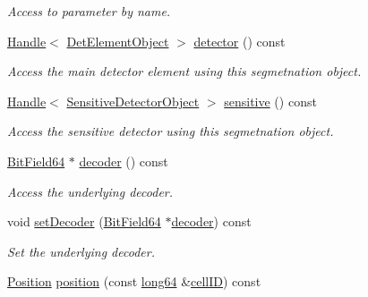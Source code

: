 \begin{DoxyCompactItemize}
\begin{DoxyCompactList}\small\item\em Access to parameter by name. \end{DoxyCompactList}\item 
\hyperlink{class_d_d4hep_1_1_handle}{Handle}$<$ \hyperlink{class_d_d4hep_1_1_geometry_1_1_det_element_object}{Det\+Element\+Object} $>$ \hyperlink{class_d_d4hep_1_1_geometry_1_1_segmentation_a7960b9b5d6233ee3e3e42893f3ea1d66}{detector} () const
\begin{DoxyCompactList}\small\item\em Access the main detector element using this segmetnation object. \end{DoxyCompactList}\item 
\hyperlink{class_d_d4hep_1_1_handle}{Handle}$<$ \hyperlink{class_d_d4hep_1_1_geometry_1_1_sensitive_detector_object}{Sensitive\+Detector\+Object} $>$ \hyperlink{class_d_d4hep_1_1_geometry_1_1_segmentation_ad8adcfc054aec5a68f37c54752e12d40}{sensitive} () const
\begin{DoxyCompactList}\small\item\em Access the sensitive detector using this segmetnation object. \end{DoxyCompactList}\item 
\hyperlink{class_d_d4hep_1_1_d_d_segmentation_1_1_bit_field64}{Bit\+Field64} $\ast$ \hyperlink{class_d_d4hep_1_1_geometry_1_1_segmentation_acab8b5976de44a26178bab5b9b92dad7}{decoder} () const
\begin{DoxyCompactList}\small\item\em Access the underlying decoder. \end{DoxyCompactList}\item 
void \hyperlink{class_d_d4hep_1_1_geometry_1_1_segmentation_a6a403aeaae687498508b537513eb1867}{set\+Decoder} (\hyperlink{class_d_d4hep_1_1_d_d_segmentation_1_1_bit_field64}{Bit\+Field64} $\ast$\hyperlink{class_d_d4hep_1_1_geometry_1_1_segmentation_acab8b5976de44a26178bab5b9b92dad7}{decoder}) const
\begin{DoxyCompactList}\small\item\em Set the underlying decoder. \end{DoxyCompactList}\item 
\hyperlink{namespace_d_d4hep_1_1_geometry_a55083902099d03506c6db01b80404900}{Position} \hyperlink{class_d_d4hep_1_1_geometry_1_1_segmentation_a870d558d46763a00c16b6bed9e1a06f5}{position} (const \hyperlink{namespace_d_d4hep_ac2a70e722b33dc7ddaa20db8954ac836}{long64} \&\hyperlink{class_d_d4hep_1_1_geometry_1_1_segmentation_a39785430e3bf6f2de6df12f94cdcafe1}{cell\+ID}) const

\end{DoxyCompactItemize}
